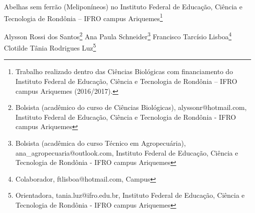 \documentclass[article,12pt,onesidea,4paper,english,brazil]{abntex2}
\begin{document}
	
	
	\frenchspacing 
	
	\begin{center}
		\LARGE Abelhas sem ferrão (Meliponíneos) no Instituto Federal de Educação, Ciência e Tecnologia de Rondônia – IFRO campus Ariquemes\footnote{Trabalho realizado dentro das Ciências Biológicas com financiamento do Instituto Federal de Educação, Ciência e Tecnologia de Rondônia – IFRO campus Ariquemes (2016/2017).}
		
		\normalsize
	Alysson Rossi dos Santos\footnote{Bolsista (acadêmico do curso de Ciências Biológicas), alyssonr@hotmail.com, Instituto Federal de Educação, Ciência e Tecnologia de Rondônia - IFRO campus Ariquemes} 
		Ana Paula Schneider\footnote{Bolsista (acadêmica do curso Técnico em Agropecuária), ana\_agropecuaria@outlook.com, Instituto Federal de Educação, Ciência e Tecnologia de Rondônia - IFRO campus Ariquemes} 
	Francisco Tarcísio Lisboa\footnote{Colaborador, ftlisboa@hotmail.com, Campus} 
		Clotilde Tânia Rodrigues Luz\footnote{Orientadora, tania.luz@ifro.edu.br, Instituto Federal de Educação, Ciência e Tecnologia de Rondônia - IFRO campus Ariquemes} 
	\end{center}
	
\end{document}

